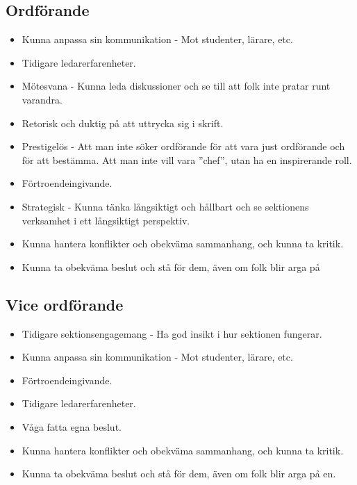 \documentclass[a4paper]{article}
\begin{document}
\subsection*{Ordförande}
\begin{itemize}
\item Kunna anpassa sin kommunikation - Mot studenter, lärare, etc.
\item Tidigare ledarerfarenheter.
\item Mötesvana - Kunna leda diskussioner och se till att folk inte pratar runt varandra.
\item Retorisk och duktig på att uttrycka sig i skrift.
\item Prestigelös - Att man inte söker ordförande för att vara just ordförande och för att bestämma. Att man inte vill vara ''chef'', utan ha en inspirerande roll.
\item Förtroendeingivande.
\item Strategisk - Kunna tänka långsiktigt och hållbart och se sektionens verksamhet i ett långsiktigt perspektiv.
\item Kunna hantera konflikter och obekväma sammanhang, och kunna ta kritik.
\item Kunna ta obekväma beslut och stå för dem, även om folk blir arga på
\end{itemize}

\subsection*{Vice ordförande}
\begin{itemize}
\item Tidigare sektionsengagemang - Ha god insikt i hur sektionen fungerar.
\item Kunna anpassa sin kommunikation - Mot studenter, lärare, etc.
\item Förtroendeingivande.
\item Tidigare ledarerfarenheter.
\item Våga fatta egna beslut.
\item Kunna hantera konflikter och obekväma sammanhang, och kunna ta kritik.
\item Kunna ta obekväma beslut och stå för dem, även om folk blir arga på en.

\end{itemize}
\end{document}
